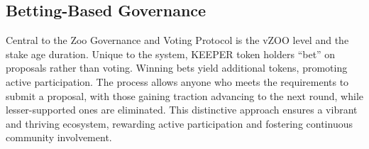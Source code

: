 \subsection{Betting-Based Governance}

Central to the Zoo Governance and Voting Protocol is the vZOO level and the stake age duration. Unique to the system, KEEPER token holders ``bet'' on proposals rather than voting. Winning bets yield additional tokens, promoting active participation. The process allows anyone who meets the requirements to submit a proposal, with those gaining traction advancing to the next round, while lesser-supported ones are eliminated. This distinctive approach ensures a vibrant and thriving ecosystem, rewarding active participation and fostering continuous community involvement.
